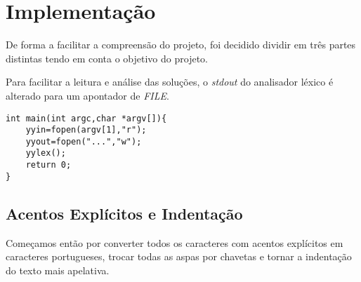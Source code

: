 \begin{titlepage}

\newpage %

\end{titlepage}

\tableofcontents

\begin{appendix}
	\listoffigures
    \renewcommand\lstlistlistingname{Listagens}
    \lstlistoflistings
\end{appendix}

\vfill
\newpage
\section{Implementação}
De forma a facilitar a compreensão do projeto, foi decidido dividir em três partes distintas tendo em conta o objetivo do projeto.

Para facilitar a leitura e análise das soluções, o \emph{stdout} do analisador léxico é alterado para um apontador de \emph{FILE}.
\begin{center}
\begin{minipage}{8cm}
\begin{verbatim}
int main(int argc,char *argv[]){
	yyin=fopen(argv[1],"r");
	yyout=fopen("...","w");
	yylex();
	return 0;
}
\end{verbatim}
\end{minipage}
\end{center}

\subsection{Acentos Explícitos e Indentação}
Começamos então por converter todos os caracteres com acentos explícitos em caracteres portugueses, trocar todas as aspas por chavetas e tornar a indentação do texto mais apelativa.

